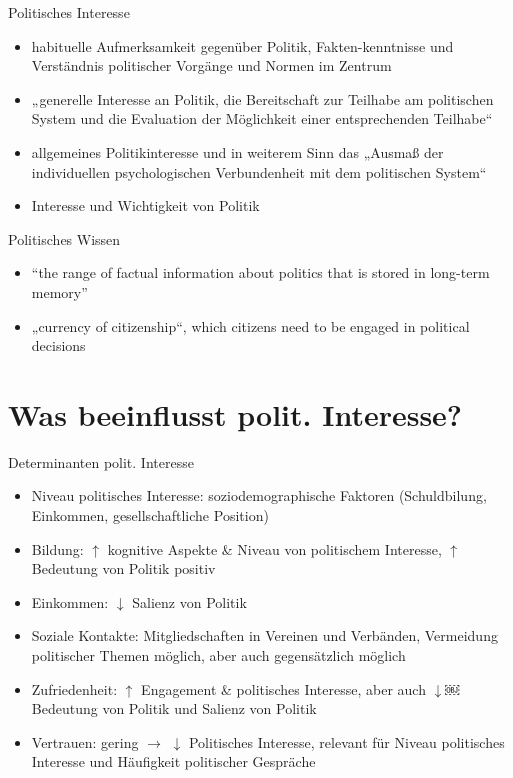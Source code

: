 \documentclass[11pt]{beamer}
\begin{document}
\begin{frame}[t]{Politisches Interesse}
			 \pause
			\begin{itemize}
				\item habituelle Aufmerksamkeit gegenüber Politik, Fakten-kenntnisse und Verständnis politischer Vorgänge und Normen im Zentrum \parencite{Zaller1992}
				\item „generelle Interesse an Politik, die Bereitschaft zur Teilhabe am politischen System und die Evaluation der Möglichkeit einer entsprechenden Teilhabe“ \parencite[72]{Pickel2002}
				\item allgemeines Politikinteresse und in weiterem Sinn das „Ausmaß der individuellen psychologischen Verbundenheit mit dem politischen System“ \parencite[72f]{Caballero2009}
				\item Interesse und Wichtigkeit von Politik \parencite{Martin2007}
			\end{itemize}
\end{frame}


\begin{frame}{Politisches Wissen}
 \pause
	\begin{itemize}
		\item “the range of factual information about politics that is stored in long-term memory” \parencite[10]{DelliCarpini1996}
		\item „currency of citizenship“, which citizens need to be engaged in political decisions \parencite[8]{DelliCarpini1996}
	\end{itemize}
\end{frame}

\section{Was beeinflusst polit. Interesse?}

\begin{frame}{Determinanten polit. Interesse \parencite{vanDeth2004}}
	\begin{itemize}
		\pause
		\item	Niveau politisches Interesse: soziodemographische Faktoren (Schuldbilung, Einkommen, gesellschaftliche Position)
		\item Bildung: $\uparrow$ kognitive Aspekte \& Niveau von politischem Interesse, $\uparrow$ Bedeutung von Politik positiv
		\item Einkommen: $\downarrow$ Salienz von Politik
		\item Soziale Kontakte: Mitgliedschaften in Vereinen und Verbänden, Vermeidung politischer Themen möglich, aber auch gegensätzlich möglich
		\item Zufriedenheit: $\uparrow$ Engagement \& politisches Interesse, aber auch $\downarrow$￼ Bedeutung von Politik und Salienz von Politik
		\item Vertrauen: gering $\rightarrow$ $\downarrow$ Politisches Interesse, relevant für Niveau politisches Interesse und Häufigkeit politischer Gespräche
	\end{itemize}
\end{frame}
\end{document}
